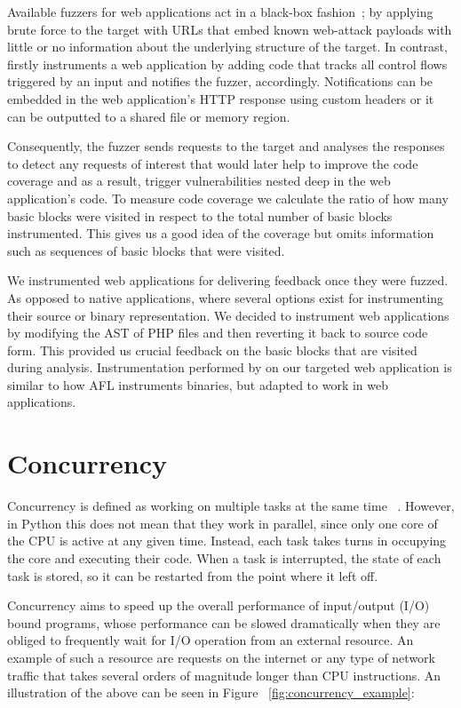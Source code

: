 Available fuzzers for web applications act in a black-box fashion~\cite{doupe2010johnny}; by applying brute force to the target with URLs that embed known web-attack payloads with little or no information about the underlying structure of the target. In contrast, \pname firstly instruments a web application by adding code that tracks all control flows triggered by an input and notifies the fuzzer, accordingly. Notifications can be embedded in the web application's HTTP response using custom headers or it can be outputted to a shared file or memory region. 

Consequently, the fuzzer sends requests to the target and analyses the responses to detect any requests of interest that would later help to improve the code coverage and as a result, trigger vulnerabilities nested deep in the web application's code. To measure code coverage we calculate the ratio of how many basic blocks were visited in respect to the total number of basic blocks instrumented. This gives us a good idea of the coverage but omits information such as sequences of basic blocks that were visited.

We instrumented web applications for delivering feedback once they were fuzzed. As opposed to native applications, where several options exist for instrumenting their source or binary representation. We decided to instrument web applications by modifying the AST of PHP files and then reverting it back to source code form. This provided us crucial feedback on the basic blocks that are visited during analysis. Instrumentation performed by \pname on our targeted web application is similar to how AFL instruments binaries, but adapted to work in web applications.

\section{Concurrency}
Concurrency is defined as working on multiple tasks at the same time ~\cite{concurrency_realpython}. However, in Python this does not mean that they work in parallel, since only one core of the CPU is active at any given time. Instead, each task takes turns in occupying the core and executing their code. When a task is interrupted, the state of each task is stored, so it can be restarted from the point where it left off. 

Concurrency aims to speed up the overall performance of input/output (I/O) bound programs, whose performance can be slowed dramatically when they are obliged to frequently wait for I/O operation from an external resource. An example of such a resource are requests on the internet or any type of network traffic that takes several orders of magnitude longer than CPU instructions. An illustration of the above can be seen in Figure ~\ref{fig:concurrency_example}:


